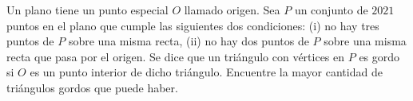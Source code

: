 Un plano tiene un punto especial $O$ llamado origen. Sea $P$ un conjunto de $2021$ puntos
en el plano que cumple las siguientes dos condiciones:
(i) no hay tres puntos de $P$ sobre una misma recta,
(ii) no hay dos puntos de $P$ sobre una misma recta que pasa por el origen.
Se dice que un triángulo con vértices en $P$ es gordo si $O$ es un punto interior de dicho triángulo.
Encuentre la mayor cantidad de triángulos gordos que puede haber.